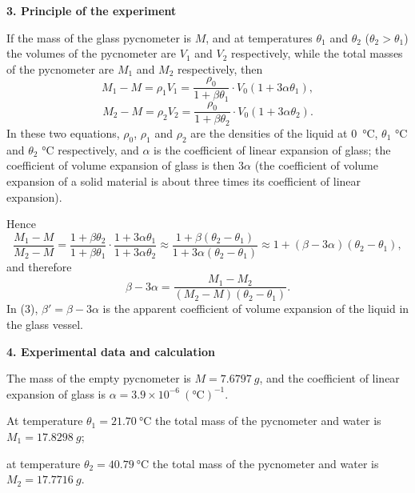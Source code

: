 \textbf{3. Principle of the experiment}

If the mass of the glass pycnometer is $M$, and at temperatures $\theta_1$ and $\theta_2$ ($\theta_2>\theta_1$) the volumes of the pycnometer are $V_1$ and $V_2$ respectively, while the total masses of the pycnometer are $M_1$ and $M_2$ respectively, then
\begin{equation}\tag{1}
M_1-M=\rho_1V_1=\frac{\rho_0}{1+\beta\theta_1}\cdot V_0(1+3\alpha\theta_1),
\end{equation}
\begin{equation}\tag{2}
M_2-M=\rho_2V_2=\frac{\rho_0}{1+\beta\theta_2}\cdot V_0(1+3\alpha\theta_2).
\end{equation}
In these two equations, $\rho_0$, $\rho_1$ and $\rho_2$ are the densities of the liquid at \SI{0}{\celsius}, $\theta_1$ \si{\celsius} and $\theta_2$ \si{\celsius} respectively, and $\alpha$ is the coefficient of linear expansion of glass; the coefficient of volume expansion of glass is then $3\alpha$ (the coefficient of volume expansion of a solid material is about three times its coefficient of linear expansion).

Hence
\begin{equation*}
\frac{M_1-M}{M_2-M}=\frac{1+\beta\theta_2}{1+\beta\theta_1}\cdot\frac{1+3\alpha\theta_1}{1+3\alpha\theta_2}
\approx\frac{1+\beta(\theta_2-\theta_1)}{1+3\alpha(\theta_2-\theta_1)}
\approx1+(\beta-3\alpha)(\theta_2-\theta_1),
\end{equation*}
and therefore
\begin{equation}\tag{3}
\beta-3\alpha=\frac{M_1-M_2}{(M_2-M)(\theta_2-\theta_1)}.
\end{equation}
In (3), $\beta'=\beta-3\alpha$ is the apparent coefficient of volume expansion of the liquid in the glass vessel.

\textbf{4. Experimental data and calculation}

The mass of the empty pycnometer is $M=\SI{7.6797}{g}$, and the coefficient of linear expansion of glass is $\alpha=3.9\times10^{-6}\ (\si{\celsius})^{-1}$.

At temperature $\theta_1=\SI{21.70}{\celsius}$ the total mass of the pycnometer and water is $M_1=\SI{17.8298}{g}$;

at temperature $\theta_2=\SI{40.79}{\celsius}$ the total mass of the pycnometer and water is $M_2=\SI{17.7716}{g}$.


